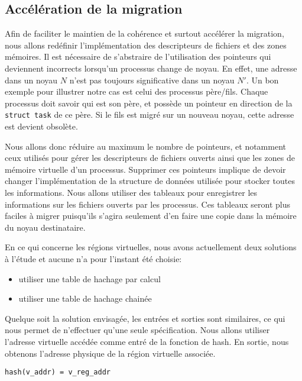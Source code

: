     \subsection{Accélération de la migration}

      Afin de faciliter le maintien de la cohérence et surtout accélérer la
      migration, nous allons redéfinir l'implémentation des descripteurs de
      fichiers et des zones mémoires. Il est nécessaire de s'abstraire de
      l'utilisation des pointeurs qui deviennent incorrects lorsqu'un processus
      change de noyau. En effet, une adresse dans un noyau $N$ n'est pas
      toujours significative dans un noyau $N'$. Un bon exemple pour illustrer
      notre cas est celui des processus père/fils. Chaque processus doit savoir
      qui est son père, et possède un pointeur en direction de la \texttt{struct
        task} de ce père. Si le fils est migré sur un nouveau noyau, cette
      adresse est devient obsolète.

      Nous allons donc réduire au maximum le nombre de pointeurs, et notamment
      ceux utilisés pour gérer les descripteurs de fichiers ouverts ainsi que
      les zones de mémoire virtuelle d'un processus. Supprimer ces pointeurs
      implique de devoir changer l'implémentation de la structure de données
      utilisée pour stocker toutes les informations. Nous allons utiliser des
      tableaux pour enregistrer les informations sur les fichiers ouverts par
      les processus. Ces tableaux seront plus faciles à migrer puisqu'ils
      s'agira seulement d'en faire une copie dans la mémoire du noyau
      destinataire.

      En ce qui concerne les régions virtuelles, nous avons actuellement deux
      solutions à l'étude et aucune n'a pour l'instant été choisie:
      \begin{itemize}
        \item utiliser une table de hachage par calcul
        \item utiliser une table de hachage chainée
      \end{itemize}

      Quelque soit la solution envisagée, les entrées et sorties sont
      similaires, ce qui nous permet de n'effectuer qu'une seule
      spécification. Nous allons utiliser l'adresse virtuelle accédée comme
      entré de la fonction de hash. En sortie, nous obtenons l'adresse physique
      de la région virtuelle associée.

      \begin{center}
        \texttt{hash(v\_addr) = v\_reg\_addr}
      \end{center}

